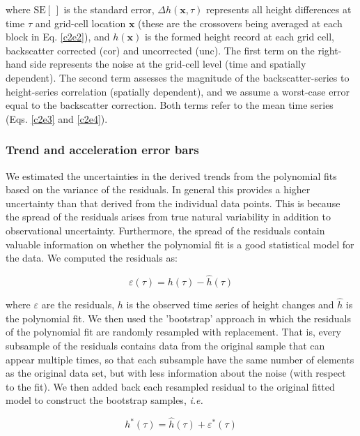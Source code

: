\noindent
where $\text{SE}[\,]$ is the standard error, $\Delta h(\mathbf x,\tau)$ represents all height differences at time $\tau$ and grid-cell location $\mathbf x$ (these are the crossovers being averaged at each block in Eq. \ref{c2e2}), and $h(\mathbf x)$ is the formed height record at each grid cell, backscatter corrected (cor) and uncorrected (unc). The first term on the right-hand side represents the noise at the grid-cell level (time and spatially dependent). The second term assesses the magnitude of the backscatter-series to height-series correlation (spatially dependent), and we assume a worst-case error equal to the backscatter correction. Both terms refer to the mean time series (Eqs. \ref{c2e3} and \ref{c2e4}).

\subsubsection{Trend and acceleration error bars}

We estimated the uncertainties in the derived trends from the polynomial fits based on the variance of the residuals. In general this provides a higher uncertainty than that derived from the individual data points. This is because the spread of the residuals arises from true natural variability in addition to observational uncertainty. Furthermore, the spread of the residuals contain valuable information on whether the polynomial fit is a good statistical model for the data. We computed the residuals as:

\begin{equation}
  \varepsilon(\tau) = h(\tau) - \hat h(\tau)
  \label{c2e8}
\end{equation}

\noindent
where $\varepsilon$ are the residuals, $h$ is the observed time series of height changes and $\hat h$ is the polynomial fit. We then used the 'bootstrap' approach \parencite{Efron1993} in which the residuals of the polynomial fit are randomly resampled with replacement. That is, every subsample of the residuals contains data from the original sample that can appear multiple times, so that each subsample have the same number of elements as the original data set, but with less information about the noise (with respect to the fit). We then added back each resampled residual to the original fitted model to construct the bootstrap samples, {\it i.e.}

\begin{equation}
  h^*(\tau) = \hat h(\tau) + \varepsilon^*(\tau)
  \label{c2e9}
\end{equation}

